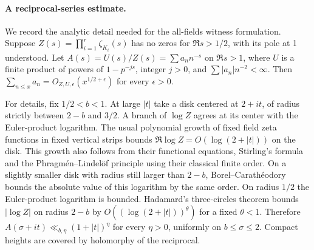 \documentclass[11pt]{article}
\begin{document}
\paragraph{A reciprocal-series estimate.}
We record the analytic detail needed for the all-fields witness formulation. Suppose \(Z(s)=\prod_{i=1}^r\zeta_{K_i}(s)\) has no zeros for \(\Re s>1/2\), with its pole at 1 understood. Let \(A(s)=U(s)/Z(s)=\sum a_n n^{-s}\) on \(\Re s>1\), where \(U\) is a finite product of powers of \(1-p^{-js}\), integer \(j>0\), and \(\sum |a_n|n^{-2}<\infty\). Then \(\sum_{n\le x}a_n=O_{Z,U,\epsilon}(x^{1/2+\epsilon})\) for every \(\epsilon>0\).

For details, fix \(1/2<b<1\). At large \(|t|\) take a disk centered at \(2+it\), of radius strictly between \(2-b\) and \(3/2\). A branch of \(\log Z\) agrees at its center with the Euler-product logarithm. The usual polynomial growth of fixed field zeta functions in fixed vertical strips bounds \(\Re\log Z=O(\log(2+|t|))\) on the disk. This growth also follows from their functional equations, Stirling's formula and the Phragm\'en--Lindel\"of principle using their classical finite order. On a slightly smaller disk with radius still larger than \(2-b\), Borel--Carath\'eodory bounds the absolute value of this logarithm by the same order. On radius \(1/2\) the Euler-product logarithm is bounded. Hadamard's three-circles theorem bounds \(|\log Z|\) on radius \(2-b\) by \(O((\log(2+|t|))^\theta)\) for a fixed \(\theta<1\). Therefore \(A(\sigma+it)\ll_{b,\eta}(1+|t|)^\eta\) for every \(\eta>0\), uniformly on \(b\le\sigma\le2\). Compact heights are covered by holomorphy of the reciprocal.
\end{document}
